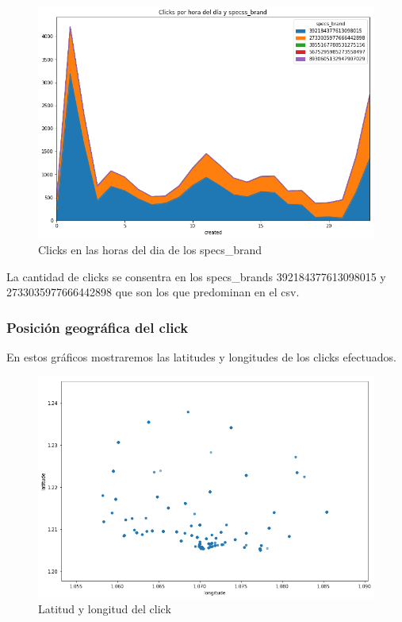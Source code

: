 \documentclass[a4paper, 12pt]{article}
\newcommand\tab[1][1cm]{\hspace*{#1}}
\begin{document}
		\FloatBarrier
		\begin{figure}[h]
			\centering
			\includegraphics[width=\textwidth]{images/clicks/clicks_specs_brand_hours.png}
			\caption{Clicks en las horas del dia de los specs_brand}
		\end{figure}
		\FloatBarrier

		\tab La cantidad de clicks se consentra en los specs_brands 392184377613098015 y 2733035977666442898 que son los que predominan en el csv.

	\subsubsection{Posición geográfica del click}
		
		\tab En estos gráficos mostraremos las latitudes y longitudes de los clicks efectuados.

		\FloatBarrier
		\begin{figure}[h]
			\centering
			\includegraphics[width=\textwidth]{images/clicks/clicks_lat_long_scatter.png}
			\caption{Latitud y longitud del click}
		\end{figure}
		\FloatBarrier
\end{document}
